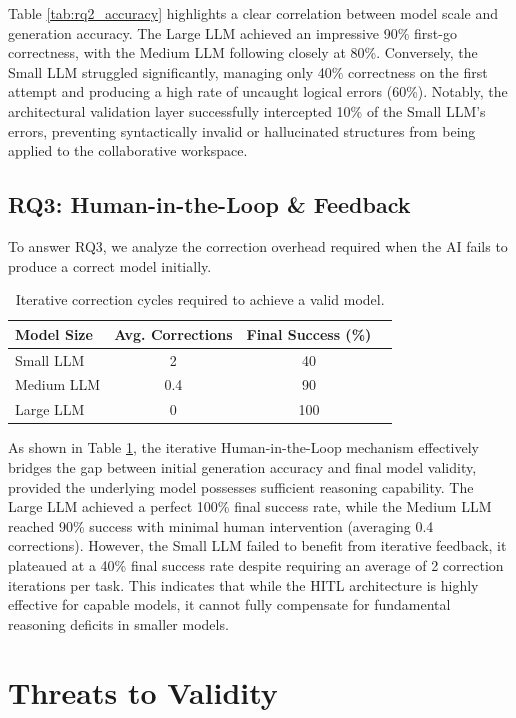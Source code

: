 Table \ref{tab:rq2_accuracy} highlights a clear correlation between model scale and generation accuracy. The Large LLM achieved an impressive 90\% first-go correctness, with the Medium LLM following closely at 80\%. Conversely, the Small LLM struggled significantly, managing only 40\% correctness on the first attempt and producing a high rate of uncaught logical errors (60\%). Notably, the architectural validation layer successfully intercepted 10\% of the Small LLM's errors, preventing syntactically invalid or hallucinated structures from being applied to the collaborative workspace.


\subsection{RQ3: Human-in-the-Loop \& Feedback}
To answer RQ3, we analyze the correction overhead required when the AI fails to produce a correct model initially.

\begin{table}[h]
\centering
\caption{Iterative correction cycles required to achieve a valid model.}
\label{tab:rq3_hitl}
\begin{tabular}{lccc}
\hline
\textbf{Model Size} & \textbf{Avg. Corrections}& \textbf{Final Success (\%)} \\
\hline
Small LLM & 2 & 40 \\
Medium LLM & 0.4 & 90  \\
Large LLM & 0 & 100 \\
\hline
\end{tabular}
\end{table}

As shown in Table \ref{tab:rq3_hitl}, the iterative Human-in-the-Loop mechanism effectively bridges the gap between initial generation accuracy and final model validity, provided the underlying model possesses sufficient reasoning capability. The Large LLM achieved a perfect 100\% final success rate, while the Medium LLM reached 90\% success with minimal human intervention (averaging 0.4 corrections). However, the Small LLM failed to benefit from iterative feedback, it plateaued at a 40\% final success rate despite requiring an average of 2 correction iterations per task. This indicates that while the HITL architecture is highly effective for capable models, it cannot fully compensate for fundamental reasoning deficits in smaller models.


\section{Threats to Validity}

